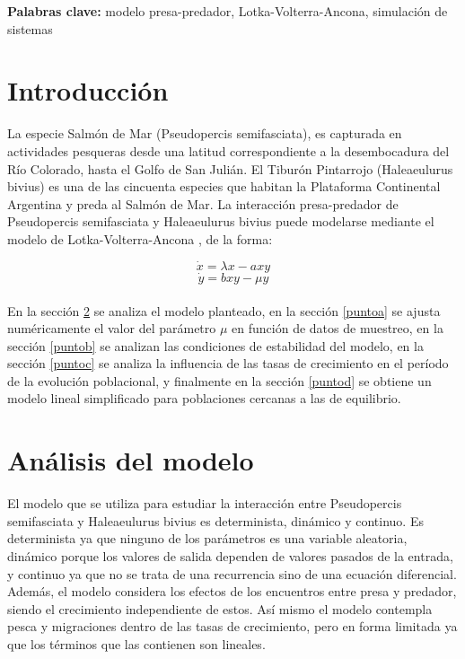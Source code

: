 \documentclass{article}
\numberwithin{equation}{section}
\begin{document}
{\bf Palabras clave:} modelo presa-predador, Lotka-Volterra-Ancona, simulación de sistemas
\begin{multicols}{2}

\section{Introducción}
La especie Salmón de Mar (Pseudopercis semifasciata), es capturada en actividades pesqueras desde una latitud correspondiente a la desembocadura del Río Colorado, hasta el Golfo de San Julián. El Tiburón Pintarrojo (Haleaeulurus bivius) es una de las cincuenta especies que habitan la Plataforma Continental Argentina y preda al Salmón de Mar. La interacción presa-predador de Pseudopercis semifasciata y Haleaeulurus bivius puede modelarse mediante el modelo de Lotka-Volterra-Ancona \cite{libro}, de la forma:

\begin{equation}
\label{lva-model1}
\dot x = \lambda x - a x y
\end{equation}
\begin{equation}
\label{lva-model2}
\dot y = b x y - \mu y
\end{equation} \\

En la sección \ref{analysis} se analiza el modelo planteado, en la sección \ref{puntoa} se ajusta numéricamente el valor del parámetro $\mu$ en función de datos de muestreo, 
en la sección \ref{puntob} se analizan las condiciones de estabilidad del modelo, en la sección \ref{puntoc} se analiza la influencia de las tasas de crecimiento en el período de la evolución poblacional, y finalmente en la sección \ref{puntod} se obtiene un modelo lineal simplificado para poblaciones cercanas a las de equilibrio.

\section{Análisis del modelo}
\label{analysis}
El modelo que se utiliza para estudiar la interacción entre Pseudopercis semifasciata y Haleaeulurus bivius es determinista, dinámico y continuo. Es determinista ya que ninguno de los parámetros es una variable aleatoria, dinámico porque los valores de salida dependen de valores pasados de la entrada, y continuo ya que no se trata de una recurrencia sino de una ecuación diferencial. \\
Además, el modelo considera los efectos de los encuentros entre presa y predador, siendo el crecimiento independiente de estos. Así mismo el modelo contempla pesca y migraciones dentro de las tasas de crecimiento, pero en forma limitada ya que los términos que las contienen son lineales.


\end{multicols}
\end{document}
